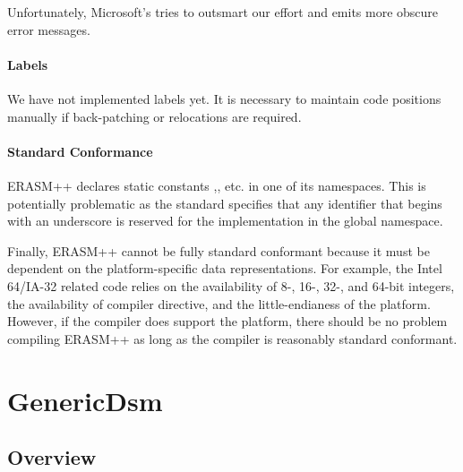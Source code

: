 \documentclass{article}
\begin{document}
Unfortunately, Microsoft's  tries to outsmart our effort and emits
more obscure error messages.

\paragraph{Labels}
\label{sec:labels}

We have not implemented labels yet. It is necessary to maintain code positions manually
if back-patching or relocations are required.

\paragraph{Standard Conformance}
\label{sec:standard-conformance}

ERASM++ declares static constants ,, etc. in one of its namespaces. This
is potentially problematic as the standard specifies that any identifier that
begins with an underscore is reserved for the implementation in the global
namespace.

Finally, ERASM++ cannot be fully standard conformant because it must
be dependent on the platform-specific data representations. For
example, the Intel 64/IA-32 related code relies on the availability of
8-, 16-, 32-, and 64-bit integers, the availability of 
compiler directive, and the little-endianess of the platform.
However, if the compiler does support the platform, there should be no
problem compiling ERASM++ as long as the compiler is reasonably
standard conformant.

\section{GenericDsm}
\label{sec:gener-dsm}

\subsection{Overview}
\label{sec:overview-1}
\end{document}
